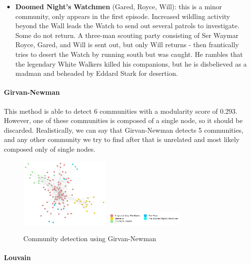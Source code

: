 \documentclass[10pt,twocolumn,letterpaper]{article}
\begin{document}
\begin{itemize}
    \item \textbf{Doomed Night's Watchmen} (Gared, Royce, Will): this is a minor community, only appears in the first episode. Increased wildling activity beyond the Wall leads the Watch to send out several patrols to investigate. Some do not return. A three-man scouting party consisting of Ser Waymar Royce, Gared, and Will is sent out, but only Will returns - then frantically tries to desert the Watch by running south but was caught. He rambles that the legendary White Walkers killed his companions, but he is disbelieved as a madman and beheaded by Eddard Stark for desertion.
\end{itemize}


\paragraph{Girvan-Newman}

This method is able to detect 6 communities with a modularity score of 0.293. However, one of these communities is composed of a single node, so it should be discarded. Realistically, we can say that Girvan-Newman detects 5 communities, and any other community we try to find after that is unrelated and most likely composed only of single nodes.

\begin{figure}[!h]
    \centering
    \includegraphics[width=0.4\textwidth]{img/s1/communties_g-n.jpg}
    \includegraphics[width=0.35\textwidth]{img/s1/g-n_legend.jpg} \\
    \vspace{0.2cm}
    \label{fig:gn_s1}
    \caption{\small{Community detection using Girvan-Newman}}
\end{figure}

\paragraph{Louvain}
\end{document}
